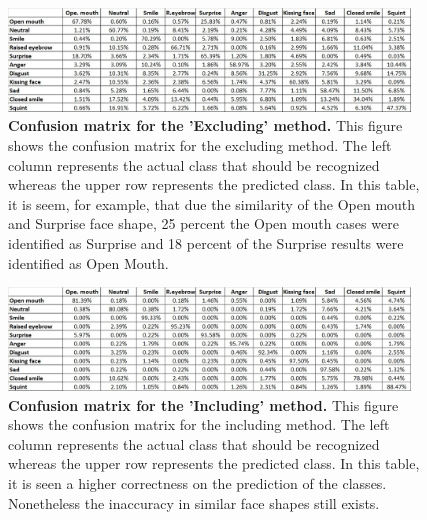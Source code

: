 \documentclass[]{article}
\begin{document}
\begin{figure}[ht]
\begin{center}
\vspace{-3mm}
\includegraphics[width=0.95\textwidth]{figures/confusionExcluding.jpg}
\end{center}
\caption{\textbf{Confusion matrix for the 'Excluding' method.} This figure shows
the confusion matrix for the excluding method. The left column represents the
actual class that should be recognized whereas the upper row represents the
predicted class. In this table, it is seem, for example, that due the similarity
of the Open mouth and Surprise face shape, 25 percent the Open mouth cases were
identified as Surprise and 18 percent of the Surprise results were identified as
Open Mouth.}
\label{coExcluding}
\end{figure}

\begin{figure}[ht]
\begin{center}
\vspace{-3mm}
\includegraphics[width=0.95\textwidth]{figures/confusionIncluding.jpg}
\end{center}
\caption{\textbf{Confusion matrix for the 'Including' method.} This figure 
shows the confusion matrix for the including method. The left column represents 
the actual class that should be recognized whereas the upper row represents the 
predicted class. In this table, it is seen a higher correctness on the
prediction  of the classes. Nonetheless the inaccuracy in similar face shapes
still exists. }
\label{coIncluding}
\end{figure}
\end{document}

